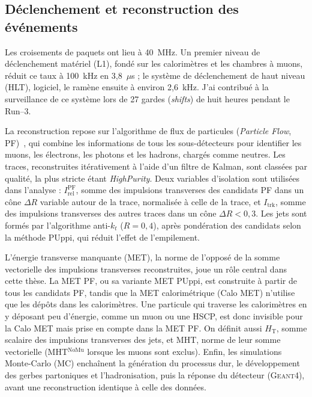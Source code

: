 \subsection{Déclenchement et reconstruction des événements}

Les croisements de paquets ont lieu à 40~MHz. Un premier niveau de déclenchement matériel (L1), fondé sur les calorimètres et les chambres à muons, réduit ce taux à 100~kHz en 3,8~$\mu$s ; le système de déclenchement de haut niveau (HLT), logiciel, le ramène ensuite à environ 2,6~kHz. J'ai contribué à la surveillance de ce système lors de 27 gardes (\textit{shifts}) de huit heures pendant le Run--3.

La reconstruction repose sur l'algorithme de flux de particules (\textit{Particle Flow}, PF)~\cite{PFalgo}, qui combine les informations de tous les sous-détecteurs pour identifier les muons, les électrons, les photons et les hadrons, chargés comme neutres. Les traces, reconstruites itérativement à l'aide d'un filtre de Kalman, sont classées par qualité, la plus stricte étant \textit{HighPurity}. Deux variables d'isolation sont utilisées dans l'analyse : $I_\mathrm{rel}^\mathrm{PF}$, somme des impulsions transverses des candidats PF dans un cône $\Delta R$ variable autour de la trace, normalisée à celle de la trace, et $I_\mathrm{trk}$, somme des impulsions transverses des autres traces dans un cône $\Delta R<0{,}3$. Les jets sont formés par l'algorithme anti-$k_t$ ($R=0{,}4$), après pondération des candidats selon la méthode PUppi, qui réduit l'effet de l'empilement.

L'énergie transverse manquante (MET), la norme de l'opposé de la somme vectorielle des impulsions transverses reconstruites, joue un rôle central dans cette thèse. La MET PF, ou sa variante MET PUppi, est construite à partir de tous les candidats PF, tandis que la MET calorimétrique (Calo MET) n'utilise que les dépôts dans les calorimètres. Une particule qui traverse les calorimètres en y déposant peu d'énergie, comme un muon ou une HSCP, est donc invisible pour la Calo MET mais prise en compte dans la MET PF. On définit aussi $H_\mathrm{T}$, somme scalaire des impulsions transverses des jets, et MHT, norme de leur somme vectorielle (MHT$^\mathrm{NoMu}$ lorsque les muons sont exclus). Enfin, les simulations Monte-Carlo (MC) enchaînent la génération du processus dur, le développement des gerbes partoniques et l'hadronisation, puis la réponse du détecteur (\textsc{Geant4}), avant une reconstruction identique à celle des données.


